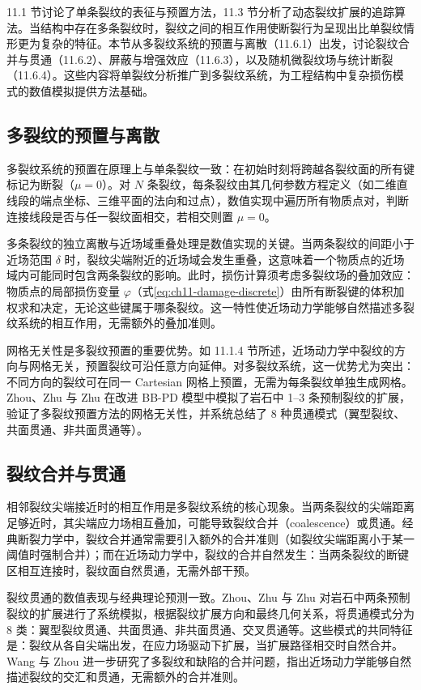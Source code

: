 11.1 节讨论了单条裂纹的表征与预置方法，11.3 节分析了动态裂纹扩展的追踪算法。当结构中存在多条裂纹时，裂纹之间的相互作用使断裂行为呈现出比单裂纹情形更为复杂的特征。本节从多裂纹系统的预置与离散（11.6.1）出发，讨论裂纹合并与贯通（11.6.2）、屏蔽与增强效应（11.6.3），以及随机微裂纹场与统计断裂（11.6.4）。这些内容将单裂纹分析推广到多裂纹系统，为工程结构中复杂损伤模式的数值模拟提供方法基础。

\subsection{多裂纹的预置与离散}\label{sec:ch11-multi-crack-pre}

多裂纹系统的预置在原理上与单条裂纹一致：在初始时刻将跨越各裂纹面的所有键标记为断裂（$\mu=0$）。对 $N$ 条裂纹，每条裂纹由其几何参数方程定义（如二维直线段的端点坐标、三维平面的法向和过点），数值实现中遍历所有物质点对，判断连接线段是否与任一裂纹面相交，若相交则置 $\mu=0$。

多条裂纹的独立离散与近场域重叠处理是数值实现的关键。当两条裂纹的间距小于近场范围 $\delta$ 时，裂纹尖端附近的近场域会发生重叠，这意味着一个物质点的近场域内可能同时包含两条裂纹的影响。此时，损伤计算须考虑多裂纹场的叠加效应：物质点的局部损伤变量 $\varphi$（式\eqref{eq:ch11-damage-discrete}）由所有断裂键的体积加权求和决定，无论这些键属于哪条裂纹。这一特性使近场动力学能够自然描述多裂纹系统的相互作用，无需额外的叠加准则。

网格无关性是多裂纹预置的重要优势。如 11.1.4 节所述，近场动力学中裂纹的方向与网格无关，预置裂纹可沿任意方向延伸。对多裂纹系统，这一优势尤为突出：不同方向的裂纹可在同一 Cartesian 网格上预置，无需为每条裂纹单独生成网格。Zhou、Zhu 与 Zhu \cite{ZhouZhuZhu2022} 在改进 BB-PD 模型中模拟了岩石中 1--3 条预制裂纹的扩展，验证了多裂纹预置方法的网格无关性，并系统总结了 8 种贯通模式（翼型裂纹、共面贯通、非共面贯通等）。

\subsection{裂纹合并与贯通}\label{sec:ch11-crack-coalescence}

相邻裂纹尖端接近时的相互作用是多裂纹系统的核心现象。当两条裂纹的尖端距离足够近时，其尖端应力场相互叠加，可能导致裂纹合并（coalescence）或贯通。经典断裂力学中，裂纹合并通常需要引入额外的合并准则（如裂纹尖端距离小于某一阈值时强制合并）；而在近场动力学中，裂纹的合并自然发生：当两条裂纹的断键区相互连接时，裂纹面自然贯通，无需外部干预。

裂纹贯通的数值表现与经典理论预测一致。Zhou、Zhu 与 Zhu \cite{ZhouZhuZhu2022} 对岩石中两条预制裂纹的扩展进行了系统模拟，根据裂纹扩展方向和最终几何关系，将贯通模式分为 8 类：翼型裂纹贯通、共面贯通、非共面贯通、交叉贯通等。这些模式的共同特征是：裂纹从各自尖端出发，在应力场驱动下扩展，当扩展路径相交时自然合并。Wang 与 Zhou \cite{WangZhou2016} 进一步研究了多裂纹和缺陷的合并问题，指出近场动力学能够自然描述裂纹的交汇和贯通，无需额外的合并准则。

